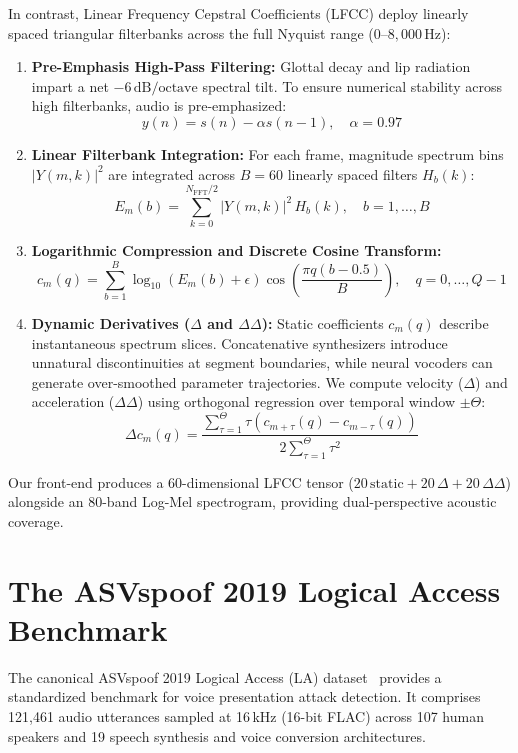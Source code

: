 \documentclass[runningheads]{llncs}
\begin{document}
In contrast, Linear Frequency Cepstral Coefficients (LFCC) deploy linearly spaced triangular filterbanks across the full Nyquist range ($0$--$8{,}000\,\text{Hz}$):
\begin{enumerate}
    \item \textbf{Pre-Emphasis High-Pass Filtering:} Glottal decay and lip radiation impart a net $-6\,\text{dB/octave}$ spectral tilt. To ensure numerical stability across high filterbanks, audio is pre-emphasized:
    \begin{equation}
    y(n) = s(n) - \alpha s(n-1), \quad \alpha = 0.97
    \end{equation}
    \item \textbf{Linear Filterbank Integration:} For each frame, magnitude spectrum bins $|Y(m, k)|^2$ are integrated across $B = 60$ linearly spaced filters $H_b(k)$:
    \begin{equation}
    E_m(b) = \sum_{k=0}^{N_{\text{FFT}}/2} |Y(m, k)|^2 \, H_b(k), \quad b = 1, \dots, B
    \end{equation}
    \item \textbf{Logarithmic Compression and Discrete Cosine Transform:}
    \begin{equation}
    c_m(q) = \sum_{b=1}^{B} \log_{10}\left(E_m(b) + \epsilon\right) \cos\left(\frac{\pi q (b - 0.5)}{B}\right), \quad q = 0, \dots, Q-1
    \end{equation}
    \item \textbf{Dynamic Derivatives ($\Delta$ and $\Delta\Delta$):} Static coefficients $c_m(q)$ describe instantaneous spectrum slices. Concatenative synthesizers introduce unnatural discontinuities at segment boundaries, while neural vocoders can generate over-smoothed parameter trajectories. We compute velocity ($\Delta$) and acceleration ($\Delta\Delta$) using orthogonal regression over temporal window $\pm \Theta$:
    \begin{equation}
    \Delta c_m(q) = \frac{\sum_{\tau=1}^{\Theta} \tau \left(c_{m+\tau}(q) - c_{m-\tau}(q)\right)}{2 \sum_{\tau=1}^{\Theta} \tau^2}
    \end{equation}
\end{enumerate}
Our front-end produces a $60$-dimensional LFCC tensor ($20\,\text{static} + 20\,\Delta + 20\,\Delta\Delta$) alongside an $80$-band Log-Mel spectrogram, providing dual-perspective acoustic coverage.

\section{The ASVspoof 2019 Logical Access Benchmark}
\label{sec:dataset}
The canonical ASVspoof 2019 Logical Access (LA) dataset~\cite{todisco2019asvspoof} provides a standardized benchmark for voice presentation attack detection. It comprises 121,461 audio utterances sampled at 16\,kHz (16-bit FLAC) across 107 human speakers and 19 speech synthesis and voice conversion architectures.
\end{document}
